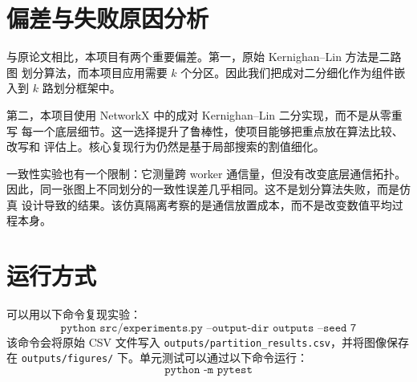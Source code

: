 \documentclass[UTF8, 11pt]{ctexart}
\begin{document}
\section{偏差与失败原因分析}

与原论文相比，本项目有两个重要偏差。第一，原始 Kernighan--Lin 方法是二路图
划分算法，而本项目应用需要 $k$ 个分区。因此我们把成对二分细化作为组件嵌入到
$k$ 路划分框架中。

第二，本项目使用 NetworkX 中的成对 Kernighan--Lin 二分实现，而不是从零重写
每一个底层细节。这一选择提升了鲁棒性，使项目能够把重点放在算法比较、改写和
评估上。核心复现行为仍然是基于局部搜索的割值细化。

一致性实验也有一个限制：它测量跨 worker 通信量，但没有改变底层通信拓扑。
因此，同一张图上不同划分的一致性误差几乎相同。这不是划分算法失败，而是仿真
设计导致的结果。该仿真隔离考察的是通信放置成本，而不是改变数值平均过程本身。

\section{运行方式}

可以用以下命令复现实验：
\[
\texttt{python src/experiments.py --output-dir outputs --seed 7}
\]
该命令会将原始 CSV 文件写入
\texttt{outputs/partition\_results.csv}，并将图像保存在
\texttt{outputs/figures/} 下。单元测试可以通过以下命令运行：
\[
\texttt{python -m pytest}
\]
\end{document}

